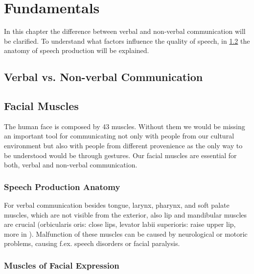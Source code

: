 \chapter{Fundamentals}
\label{cha:fundamentals}

In this chapter the difference between verbal and non-verbal communication will be clarified. To understand what factors influence the quality of speech, in \ref{sec:anatomy} the anatomy of speech production will be explained.  



\section{Verbal vs. Non-verbal Communication} %
\label{sec:communication}


\section{Facial Muscles} %
\label{sec:anatomy}


The human face is composed by 43 muscles. Without them we would be missing an important tool for communicating not only with people from our cultural environment but also with people from different provenience as the only way to be understood would be through gestures. Our facial muscles are essential for both, verbal and non-verbal communication.\par 

\subsection{Speech Production Anatomy}
For verbal communication besides tongue, larynx, pharynx, and soft palate muscles, which are not visible from the exterior, also lip and mandibular muscles are crucial (orbicularis oris: close lips, levator labii superioris: raise upper lip, more in \cite{PhonManual}). 
Malfunction of these muscles can be caused by neurological or motoric problems, causing f.ex. speech disorders or facial paralysis. 

\subsection{Muscles of Facial Expression}

